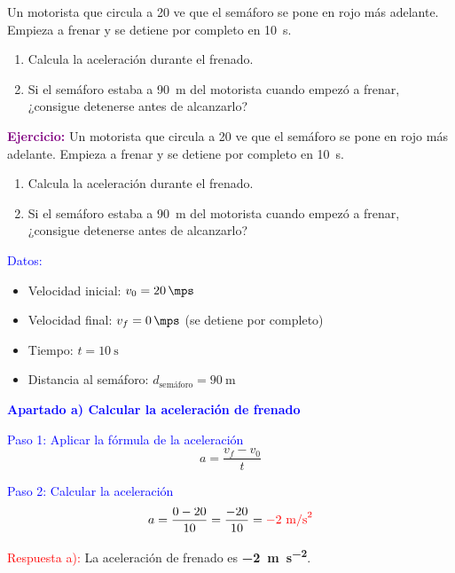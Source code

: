 \begin{exercise}
    Un motorista que circula a \qty{20}{\mps} ve que el semáforo se pone en rojo más adelante. Empieza a frenar y se detiene por completo en \qty{10}{\s}.
    \begin{enumerate}[label=\letraminuscula]
    \item Calcula la aceleración durante el frenado.
    \item Si el semáforo estaba a \qty{90}{\m} del motorista cuando empezó a frenar, ¿consigue detenerse antes de alcanzarlo?
    \end{enumerate}
    \begin{solu}
        \textbf{\textcolor{purple}{Ejercicio:}} Un motorista que circula a \qty{20}{\mps} ve que el semáforo se pone en rojo más adelante. Empieza a frenar y se detiene por completo en \qty{10}{\s}.
        \begin{enumerate}[label=\letraminuscula]
            \item Calcula la aceleración durante el frenado.
            \item Si el semáforo estaba a \qty{90}{\m} del motorista cuando empezó a frenar, ¿consigue detenerse antes de alcanzarlo?
        \end{enumerate}

        \vspace{0.3cm}

        \textcolor{blue}{Datos:}
        \begin{itemize}
            \item Velocidad inicial: $v_0 = \qty{20}{\mps}$
            \item Velocidad final: $v_f = \qty{0}{\mps}$ (se detiene por completo)
            \item Tiempo: $t = \qty{10}{\s}$
            \item Distancia al semáforo: $d_{\text{semáforo}} = \qty{90}{\m}$
        \end{itemize}

        \textbf{\textcolor{blue}{Apartado a) Calcular la aceleración de frenado}}

        \textcolor{blue}{Paso 1: Aplicar la fórmula de la aceleración}
        \[
            \boxed{a = \frac{v_f - v_0}{t}}
        \]

        \textcolor{blue}{Paso 2: Calcular la aceleración}
        \[
            a = \frac{0 - 20}{10} = \frac{-20}{10} = \textcolor{red}{-2 \text{ m/s}^2}
        \]

        \textcolor{red}{Respuesta a):} La aceleración de frenado es \textbf{\qty{-2}{\metre\per\second\squared}}.


\end{solu}
\end{exercise}
